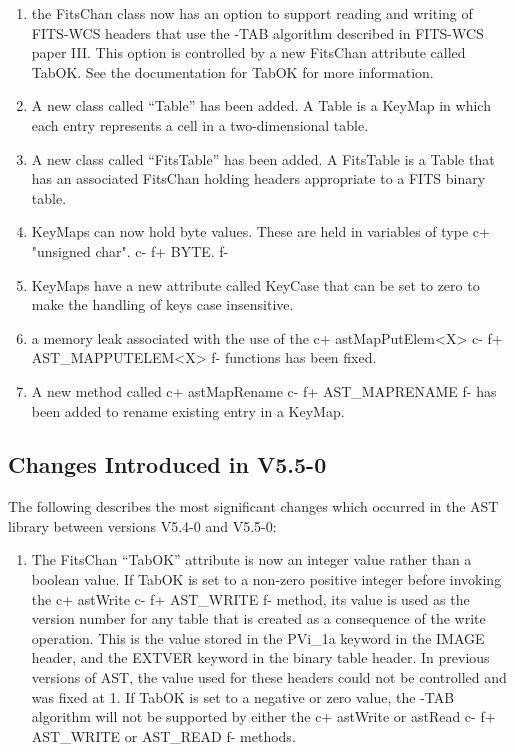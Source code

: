 \documentclass[twoside,11pt]{article}
\begin{document}
\begin{enumerate}

\item the FitsChan class now has an option to support reading and writing
of FITS-WCS headers that use the -TAB algorithm described in FITS-WCS paper
III. This option is controlled by a new FitsChan attribute called TabOK.
See the documentation for TabOK for more information.

\item A new class called ``Table'' has been added. A Table is a KeyMap in
which each entry represents a cell in a two-dimensional table.

\item A new class called ``FitsTable'' has been added. A FitsTable is a
Table that has an associated FitsChan holding headers appropriate to a
FITS binary table.

\item KeyMaps can now hold byte values. These are held in variables
of type
c+
"unsigned char".
c-
f+
BYTE.
f-

\item KeyMaps have a new attribute called KeyCase that can be set to zero to
make the handling of keys case insensitive.

\item a memory leak associated with the use of the
c+
astMapPutElem<X>
c-
f+
AST\_MAPPUTELEM<X>
f-
functions has been fixed.

\item A new method called
c+
astMapRename
c-
f+
AST\_MAPRENAME
f-
has been added to rename existing entry in a KeyMap.
\end{enumerate}

\subsection{Changes Introduced in V5.5-0}

The following describes the most significant changes which
occurred in the AST library between versions V5.4-0 and V5.5-0:

\begin{enumerate}

\item The FitsChan ``TabOK'' attribute is now an integer value rather
than a boolean value. If TabOK is set to a non-zero positive integer
before invoking the
c+
astWrite
c-
f+
AST\_WRITE
f-
method, its value is used as the version number for any table that is
created as a consequence of the write operation. This is the value stored
in the PVi\_1a keyword in the IMAGE header, and the EXTVER keyword in the
binary table header. In previous versions of AST, the value used for these
headers could not be controlled and was fixed at 1. If TabOK is set to a
negative or zero value, the -TAB algorithm will not be supported by
either the
c+
astWrite or astRead
c-
f+
AST\_WRITE or AST\_READ
f-
methods.

\end{enumerate}
\end{document}
